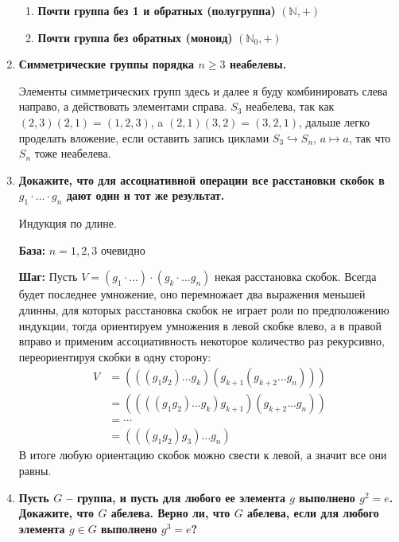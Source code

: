 \documentclass{article}
\begin{document}
\begin{enumerate}
\begin{enumerate}
            \item \textbf{Почти группа без 1 и обратных (полугруппа)} $(\mathbb{N}, +)$
            \item \textbf{Почти группа без обратных (моноид)} $(\mathbb{N}_0, +)$
        \end{enumerate}

    \item \textbf{Симметрические группы порядка $n\geq 3$ неабелевы.}\par
        Элементы симметрических групп здесь и далее я буду комбинировать
        слева направо, а действовать элементами справа.
        $S_3$ неабелева, так как $(2,3)(2,1)=(1,2,3)$, a $(2,1)(3,2)=
        (3,2,1)$, дальше легко проделать вложение, если оставить запись
        циклами $S_3\hookrightarrow S_n$, $a\mapsto a$, так что
        $S_n$ тоже неабелева.

    \item \textbf{Докажите, что для ассоциативной операции все расстановки
        скобок в $g_1\cdot\ldots\cdot g_n$ дают один и тот же результат.}

        Индукция по длине.

        \textbf{База:} $n=1,2,3$ очевидно

        \textbf{Шаг:} Пусть $V=(g_1\cdot\ldots)\cdot(g_k\cdot\ldots g_n)$ некая
        расстановка скобок. Всегда будет последнее умножение, оно перемножает
        два выражения меньшей длинны, для которых расстановка скобок не играет
        роли по предположению индукции, тогда ориентируем умножения в левой
        скобке влево, а в правой вправо и применим ассоциативность некоторое
        количество раз рекурсивно, переориентируя скобки в одну сторону:
        \begin{align*}
            V&=(((g_1g_2)\ldots g_k)(g_{k+1}(g_{k+2}\ldots g_n))) \\
            &=((((g_1g_2)\ldots g_k)g_{k+1})(g_{k+2}\ldots g_n))\\
            &=\cdots\\
            &=(((g_1g_2)g_3)\ldots g_n)
        \end{align*}
        В итоге любую ориентацию скобок можно свести к левой, а значит все они
        равны.
    \item \textbf{Пусть $G$ – группа, и пусть для любого ее элемента $g$ выполнено
        $g^2=e$. Докажите, что $G$ абелева. Верно ли, что $G$ абелева, если для
        любого элемента $g\in G$ выполнено $g^3=e$?}
        

\end{enumerate}
\end{document}
